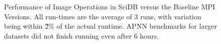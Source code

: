 \documentclass[tog]{acmsiggraph}
\begin{document}
\begin{figure}[htp]
\centering
	 \hspace{1 em}
	 \hspace{1 em}
	\caption{Performance of Image Operations in SciDB versus the Baseline MPI Versions. All run-times are the average of 3 runs, with variation being within \~2\% of the actual runtime. APNN benchmarks for larger datasets did not finish running even after 6 hours.}
	\label{fig:mpi_result}
\end{figure}
\end{document}
